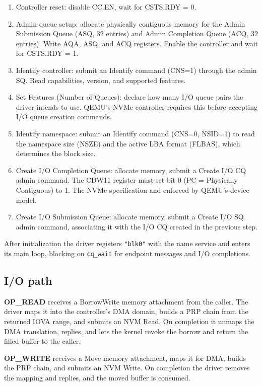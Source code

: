 \begin{enumerate}
    \item Controller reset: disable CC.EN, wait for CSTS.RDY = 0.
    \item Admin queue setup: allocate physically contiguous memory for the
        Admin Submission Queue (ASQ, 32 entries) and Admin Completion Queue
        (ACQ, 32 entries). Write AQA, ASQ, and ACQ registers. Enable the
        controller and wait for CSTS.RDY = 1.
    \item Identify controller: submit an Identify command (CNS=1) through
        the admin SQ. Read capabilities, version, and supported features.
    \item Set Features (Number of Queues): declare how many I/O queue
        pairs the driver intends to use. QEMU's NVMe controller requires this
        before accepting I/O queue creation commands.
    \item Identify namespace: submit an Identify command (CNS=0, NSID=1)
        to read the namespace size (NSZE) and the active LBA format (FLBAS),
        which determines the block size.
    \item Create I/O Completion Queue: allocate memory, submit a Create
        I/O CQ admin command. The CDW11 register must set bit 0 (PC =
        Physically Contiguous) to 1. The NVMe
        specification and enforced by QEMU's device model.
    \item Create I/O Submission Queue: allocate memory, submit a Create
        I/O SQ admin command, associating it with the I/O CQ created in the
        previous step.
\end{enumerate}

After initialization the driver registers \texttt{"blk0"} with the name service
and enters its main loop, blocking on \texttt{cq\_wait} for endpoint messages
and I/O completions.

\subsection{I/O path}

\textbf{OP\_READ} receives a BorrowWrite memory attachment from the caller. The
driver maps it into the controller's DMA domain, builds a PRP chain from the
returned IOVA range, and submits an NVM Read. On completion it unmaps the DMA
translation, replies, and lets the kernel revoke the borrow and return the filled
buffer to the caller.

\textbf{OP\_WRITE} receives a Move memory attachment, maps it for DMA, builds the
PRP chain, and submits an NVM Write. On completion the driver removes the mapping
and replies, and the moved buffer is consumed.

